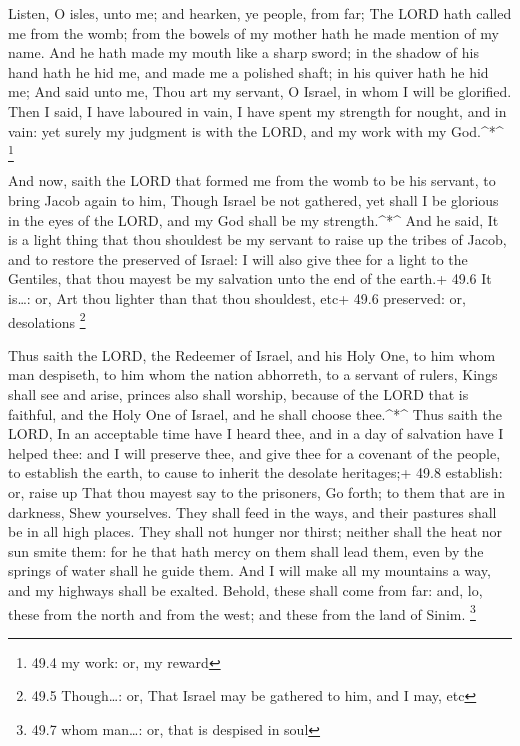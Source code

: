  Listen, O isles, unto me; and hearken, ye people, from far;
The LORD hath called me from the womb; from the bowels of my mother hath
he made mention of my name.  And he hath made my mouth like
a sharp sword; in the shadow of his hand hath he hid me, and made me a
polished shaft; in his quiver hath he hid me;  And said unto
me, Thou art my servant, O Israel, in whom I will be glorified.
 Then I said, I have laboured in vain, I have spent my
strength for nought, and in vain: yet surely my judgment is with the
LORD, and my work with my God.\^{}*\^{} \footnote{49.4 my work: or, my
  reward}

 And now, saith the LORD that formed me from the womb to be
his servant, to bring Jacob again to him, Though Israel be not gathered,
yet shall I be glorious in the eyes of the LORD, and my God shall be my
strength.\^{}*\^{}  And he said, It is a light thing that
thou shouldest be my servant to raise up the tribes of Jacob, and to
restore the preserved of Israel: I will also give thee for a light to
the Gentiles, that thou mayest be my salvation unto the end of the
earth.+ 49.6 It is\ldots: or, Art thou lighter than that thou shouldest,
etc+ 49.6 preserved: or, desolations \footnote{49.5 Though\ldots: or,
  That Israel may be gathered to him, and I may, etc}

 Thus saith the LORD, the Redeemer of Israel, and his Holy
One, to him whom man despiseth, to him whom the nation abhorreth, to a
servant of rulers, Kings shall see and arise, princes also shall
worship, because of the LORD that is faithful, and the Holy One of
Israel, and he shall choose thee.\^{}*\^{}  Thus saith the
LORD, In an acceptable time have I heard thee, and in a day of salvation
have I helped thee: and I will preserve thee, and give thee for a
covenant of the people, to establish the earth, to cause to inherit the
desolate heritages;+ 49.8 establish: or, raise up  That thou
mayest say to the prisoners, Go forth; to them that are in darkness,
Shew yourselves. They shall feed in the ways, and their pastures shall
be in all high places.  They shall not hunger nor thirst;
neither shall the heat nor sun smite them: for he that hath mercy on
them shall lead them, even by the springs of water shall he guide them.
 And I will make all my mountains a way, and my highways
shall be exalted.  Behold, these shall come from far: and,
lo, these from the north and from the west; and these from the land of
Sinim. \footnote{49.7 whom man\ldots: or, that is despised in soul}

